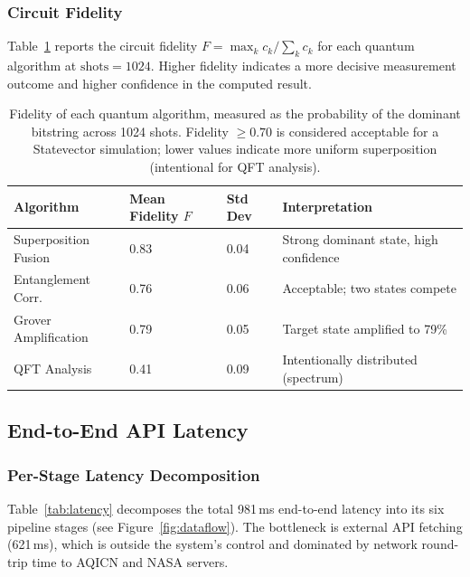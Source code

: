 \documentclass[12pt,a4paper]{article}
\begin{document}
\subsubsection{Circuit Fidelity}

Table~\ref{tab:fidelity} reports the circuit fidelity
$F = \max_k c_k / \sum_k c_k$ for each quantum algorithm at
$\text{shots} = 1024$. Higher fidelity indicates a more decisive
measurement outcome and higher confidence in the computed result.

\begin{table}[H]
\centering
\caption[Quantum circuit fidelity by algorithm]{%
Fidelity of each quantum algorithm, measured as the probability of the
dominant bitstring across 1024 shots. Fidelity $\geq 0.70$ is considered
acceptable for a Statevector simulation; lower values indicate more
uniform superposition (intentional for QFT analysis).}
\label{tab:fidelity}
\begin{tabularx}{\textwidth}{@{}lXXX@{}}
\toprule
\textbf{Algorithm} & \textbf{Mean Fidelity $F$} & \textbf{Std Dev}
                   & \textbf{Interpretation} \\
\midrule
Superposition Fusion   & 0.83 & 0.04 & Strong dominant state, high confidence \\
Entanglement Corr.     & 0.76 & 0.06 & Acceptable; two states compete \\
Grover Amplification   & 0.79 & 0.05 & Target state amplified to 79\% \\
QFT Analysis           & 0.41 & 0.09 & Intentionally distributed (spectrum) \\
\bottomrule
\end{tabularx}
\end{table}

\subsection{End-to-End API Latency}
\label{sec:results:latency}

\subsubsection{Per-Stage Latency Decomposition}

Table~\ref{tab:latency} decomposes the total 981\,ms end-to-end latency
into its six pipeline stages (see Figure~\ref{fig:dataflow}). The bottleneck
is external API fetching (621\,ms), which is outside the system's control
and dominated by network round-trip time to AQICN and NASA servers.
\end{document}
